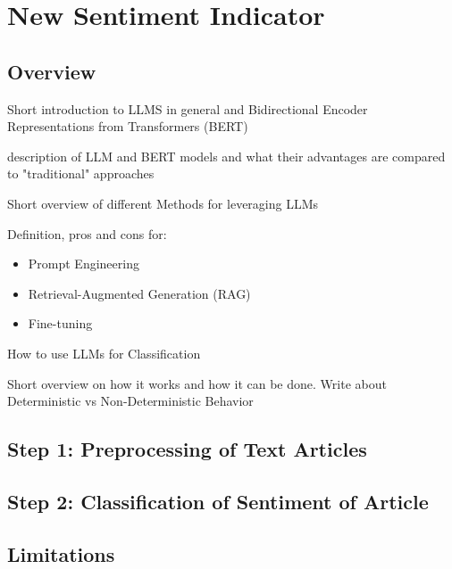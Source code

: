 \chapter{New Sentiment Indicator}\label{sec3}
\thispagestyle{empty}

\section{Overview}

Short introduction to LLMS in general and Bidirectional Encoder Representations from Transformers (BERT)

description of LLM and BERT models and what their advantages are compared to "traditional" approaches

Short overview of different Methods for leveraging LLMs

Definition, pros and cons for:

\begin{itemize}
	\item Prompt Engineering
	\item Retrieval-Augmented Generation (RAG)
	\item Fine-tuning
\end{itemize}

How to use LLMs for Classification

Short overview on how it works and how it can be done. Write about Deterministic vs Non-Deterministic Behavior


\section{Step 1: Preprocessing of Text Articles}

\section{Step 2: Classification of Sentiment of Article}

\section{Limitations}

\cleardoublepage
